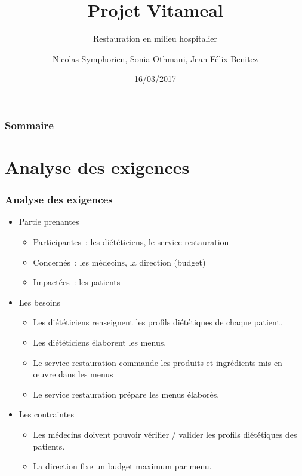 \documentclass{beamer}
\title{Projet Vitameal}
\subtitle{Restauration en milieu hospitalier}
\author{Nicolas Symphorien, Sonia Othmani, Jean-Félix Benitez}
\institute{CNAM}
\date{16/03/2017}
\begin{document}
\begin{frame}[plain]
  \titlepage
\end{frame}

\begin{frame}
  \frametitle{Sommaire}
  \tableofcontents
\end{frame}

\section{Analyse des exigences}
\begin{frame}[label=analyseDesExigences] %
\frametitle{Analyse des exigences}
\begin{itemize}
  \item Partie prenantes
  \begin{itemize}
    \item Participantes~: les diététiciens, le service restauration
    \item Concernés~: les médecins, la direction (budget)
    \item Impactées~: les patients
  \end{itemize}
  \item Les besoins
  \begin{itemize}
    \item Les diététiciens renseignent les profils diététiques de chaque patient.
    \item Les diététiciens élaborent les menus.
    \item Le service restauration commande les produits et ingrédients mis en œuvre dans les menus
    \item Le service restauration prépare les menus élaborés.
  \end{itemize}
  \item Les contraintes
  \begin{itemize}
    \item Les médecins doivent pouvoir vérifier / valider les profils diététiques des patients.
    \item La direction fixe un budget maximum par menu.
  \end{itemize}
\end{itemize}
\end{frame}
\end{document}
